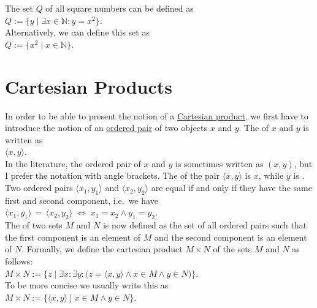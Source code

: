 \exampleEng
The set $Q$ of all square numbers can be defined as 
\\[0.2cm]
\hspace*{1.3cm}
$Q := \{ y \mid \exists x \in \mathbb{N}: y = x^2\}$.
\\[0.2cm]
Alternatively, we can define this set as
\\[0.2cm]
\hspace*{1.3cm}
$Q := \bigl\{ x^2 \mid x \in \mathbb{N} \bigr\}$.
\eox

\section{Cartesian Products}
In order to be able to present the notion of a \href{https://en.wikipedia.org/wiki/Cartesian_product}{Cartesian product},
we first have to introduce the notion of an \href{https://en.wikipedia.org/wiki/Ordered_pair}{ordered pair} of two objects
$x$ and $y$.  The  of $x$ and $y$ is written as
\\[0.2cm] 
\hspace*{1.3cm}
$\langle x, y \rangle$.
\\[0.2cm]
In the literature, the ordered pair of $x$ and $y$ is sometimes written as $(x,y)$, but I prefer the notation
with angle brackets.  The   of the pair $\langle x, y \rangle$ is $x$, while $y$ is
.  Two  ordered pairs $\langle x_1, y_1 \rangle$ and $\langle x_2, y_2 \rangle$ are
equal if and only if they have the same first and second component, i.e.~we have
\\[0.2cm]
\hspace*{1.3cm}
$\langle x_1, y_1 \rangle \,=\,\langle x_2, y_2 \rangle  \;\Leftrightarrow\; x_1 = x_2 \wedge y_1 = y_2$. 
\\[0.2cm]
The  of two sets $M$ and $N$ is now defined as the set of all ordered pairs such
that the first component is an element of  $M$ and the second component is an element of $N$.
Formally, we define the cartesian product $M \times N$ of the sets $M$ and $N$ as follows:  
\\[0.2cm]
\hspace*{1.3cm}
$M \times N := \big\{ z \mid \exists x\colon \exists y\colon\bigl(z = \langle x,y\rangle \wedge x\in M \wedge y \in N\bigr) \bigr\}$. 
\\[0.2cm]
To be more concise we usually write this as
\\[0.2cm]
\hspace*{1.3cm}
$M \times N := \big\{ \langle x,y\rangle \mid  x\in M \wedge y \in N \}$.

